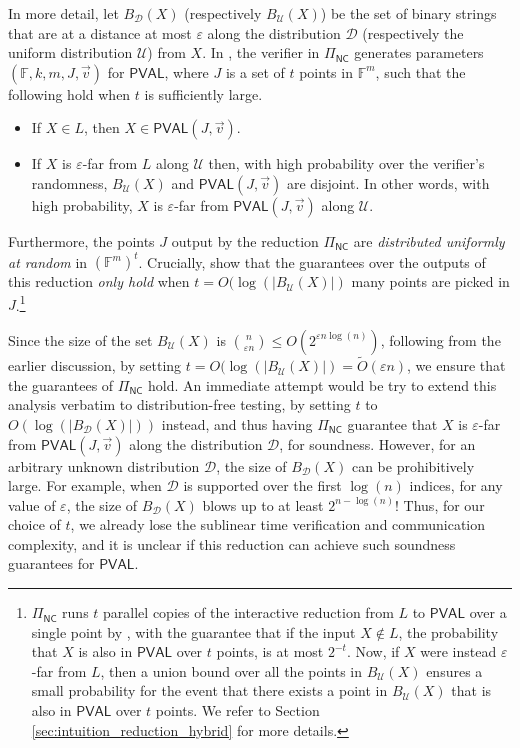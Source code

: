 \documentclass[10pt,a4paper]{article}
\newcommand{\NC}{\mathsf{NC}}
\newcommand{\PVAL}{\mathsf{PVAL}}
\newcommand{\F}{\mathbb{F}}
\newcommand{\sU}{\mathcal{U}}
\newcommand{\sD}{\mathcal{D}}
\newcommand{\eps}{\varepsilon}
\begin{document}
In more detail, let $B_\sD(X)$ (respectively $B_\sU(X)$) be the set of binary strings that are at a distance at most $\eps$ along the distribution $\sD$ (respectively the uniform distribution $\sU$) from $X$. In \cite{RVW}, the verifier in $\Pi_\NC$ generates parameters $(\F,k,m,J,\Vec{v})$ for $\PVAL$, where $J$ is a set of $t$ points in $\F^m$, such that the following hold when $t$ is sufficiently large.
\begin{itemize}
    \item If $X \in L$, then $X \in \PVAL(J,\Vec{v})$.
    \item If $X$ is $\varepsilon$-far from $L$ along $\sU$ then, with high probability over the verifier's randomness, $B_\sU(X)$ and $\PVAL(J,\Vec{v})$ are disjoint. In other words, with high probability, $X$ is $\varepsilon$-far from $\PVAL(J,\Vec{v})$ along $\sU$.
\end{itemize}
Furthermore, the points $J$ output by the reduction $\Pi_\NC$ are \textit{distributed uniformly at random} in $\left( \F^m \right)^t$. Crucially, \cite{RVW} show that the guarantees over the outputs of this reduction \textit{only hold} when $t = O(\log (\vert B_\sU(X) \vert)$ many points are picked in $J$.\footnote{\label{fn:gkr} $\Pi_\NC$ runs $t$ parallel copies of the interactive reduction from $L$ to $\PVAL$ over a single point by \cite{GKR15}, with the guarantee that if the input $X \notin L$, the probability that $X$ is also in $\PVAL$ over $t$ points, is at most $2^{-t}$. Now, if $X$ were instead $\varepsilon$-far from $L$, then a union bound over all the points in $B_\sU(X)$ ensures a small probability for the event that there exists a point in $B_\sU(X)$ that is also in $\PVAL$ over $t$ points. We refer to Section \ref{sec:intuition_reduction_hybrid} for more details.}

Since the size of the set $B_\sU (X)$ is $\binom{n}{\varepsilon n} \leq O(2^{\varepsilon n \log(n)})$, following from the earlier discussion, by setting $t = O(\log (\vert B_\sU(X) \vert) = \tilde{O}(\varepsilon n)$, we ensure that the guarantees of $\Pi_\NC$ hold. An immediate attempt would be try to extend this analysis verbatim to distribution-free testing, by setting $t$ to $O(\log (\vert B_\sD(X) \vert))$ instead, and thus having $\Pi_\NC$ guarantee that $X$ is $\varepsilon$-far from $\PVAL(J,\Vec{v})$ along the distribution $\sD$, for soundness. However, for an arbitrary unknown distribution $\sD$, the size of $B_{\sD}(X)$ can be prohibitively large. For example, when $\sD$ is supported over the first $\log(n)$ indices, for any value of $\varepsilon$, the size of $B_\sD (X)$ blows up to at least $2^{n-\log(n)}$! Thus, for our choice of $t$, we already lose the sublinear time verification and communication complexity, and it is unclear if this reduction can achieve such soundness guarantees for $\PVAL$. 
\end{document}
